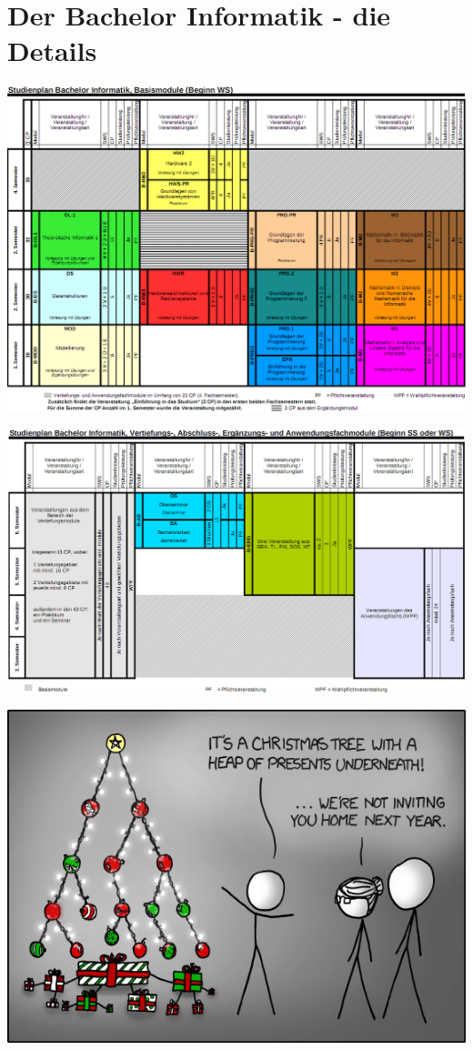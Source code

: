 \documentclass[a4paper,12pt]{scrartcl}
\newcommand{\spaltenanfang}{\begin{multicols}{2}}
\newcommand{\spaltenende}{\end{multicols}}
\begin{document}
\section{Der Bachelor Informatik - die Details}
\includegraphics[width=18cm]{bitmaps/bachelor/basismodulebachelorWS}
\newline


\includegraphics[width=18cm]{bitmaps/bachelor/sonstigemodulebachelor}
\spaltenanfang

\spaltenende
\begin{center}
	\vspace{1cm}
	\includegraphics[scale=0.63]{comics/tree}
\end{center}
\newpage
\end{document}
